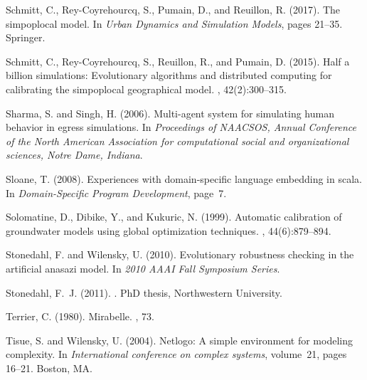 \documentclass[10pt]{article}
\begin{document}
\begin{thebibliography}{}
Schmitt, C., Rey-Coyrehourcq, S., Pumain, D., and Reuillon, R. (2017).
\newblock The simpoplocal model.
\newblock In {\em Urban Dynamics and Simulation Models}, pages 21--35.
  Springer.

Schmitt, C., Rey-Coyrehourcq, S., Reuillon, R., and Pumain, D. (2015).
\newblock Half a billion simulations: Evolutionary algorithms and distributed
  computing for calibrating the simpoplocal geographical model.
,
  42(2):300--315.

Sharma, S. and Singh, H. (2006).
\newblock Multi-agent system for simulating human behavior in egress
  simulations.
\newblock In {\em Proceedings of NAACSOS, Annual Conference of the North
  American Association for computational social and organizational sciences,
  Notre Dame, Indiana}.

Sloane, T. (2008).
\newblock Experiences with domain-specific language embedding in scala.
\newblock In {\em Domain-Specific Program Development}, page~7.

Solomatine, D., Dibike, Y., and Kukuric, N. (1999).
\newblock Automatic calibration of groundwater models using global optimization
  techniques.
, 44(6):879--894.

Stonedahl, F. and Wilensky, U. (2010).
\newblock Evolutionary robustness checking in the artificial anasazi model.
\newblock In {\em 2010 AAAI Fall Symposium Series}.

Stonedahl, F.~J. (2011).
.
\newblock PhD thesis, Northwestern University.

Terrier, C. (1980).
\newblock Mirabelle.
, 73.

Tisue, S. and Wilensky, U. (2004).
\newblock Netlogo: A simple environment for modeling complexity.
\newblock In {\em International conference on complex systems}, volume~21,
  pages 16--21. Boston, MA.


\end{thebibliography}
\end{document}
